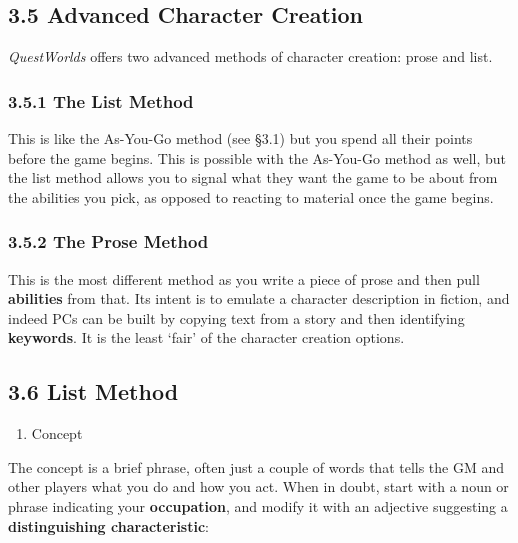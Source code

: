 \documentclass[
]{article}
\providecommand{\tightlist}{%
  \setlength{\itemsep}{0pt}\setlength{\parskip}{0pt}}
\begin{document}
\hypertarget{advanced-character-creation}{%
\subsection{3.5 Advanced Character
Creation}\label{advanced-character-creation}}

\emph{QuestWorlds} offers two advanced methods of character creation:
prose and list.

\hypertarget{the-list-method}{%
\subsubsection{3.5.1 The List Method}\label{the-list-method}}

This is like the As-You-Go method (see §3.1) but you spend all their
points before the game begins. This is possible with the As-You-Go
method as well, but the list method allows you to signal what they want
the game to be about from the abilities you pick, as opposed to reacting
to material once the game begins.

\hypertarget{the-prose-method}{%
\subsubsection{3.5.2 The Prose Method}\label{the-prose-method}}

This is the most different method as you write a piece of prose and then
pull \textbf{abilities} from that. Its intent is to emulate a character
description in fiction, and indeed PCs can be built by copying text from
a story and then identifying \textbf{keywords}. It is the least `fair'
of the character creation options.

\hypertarget{list-method}{%
\subsection{3.6 List Method}\label{list-method}}

\begin{enumerate}
\def\labelenumi{\arabic{enumi}.}
\tightlist
\item
  Concept
\end{enumerate}

The concept is a brief phrase, often just a couple of words that tells
the GM and other players what you do and how you act. When in doubt,
start with a noun or phrase indicating your \textbf{occupation}, and
modify it with an adjective suggesting a \textbf{distinguishing
characteristic}:
\end{document}
